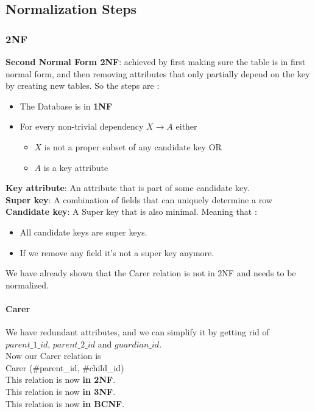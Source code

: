 \documentclass{article}
\begin{document}
\subsection{Normalization Steps}
\subsubsection{2NF}
\begin{tcolorbox}
    \textbf{Second Normal Form 2NF}: achieved by first making sure the table is in first normal form, and then removing attributes that only partially depend on the key by creating new tables. So the steps are :
    \begin{itemize}
        \item The Database is in \textbf{1NF}
        \item For every non-trivial dependency $X\rightarrow A$ either
        \begin{itemize}
            \item $X$ is not a proper subset of any candidate key OR
            \item $A$ is a key attribute
        \end{itemize}
    \end{itemize}
     \textbf{Key attribute}: An attribute that is part of some candidate key.\\
     \textbf{Super key}: A combination of fields that can uniquely determine a row \\
    \textbf{Candidate key}: A Super key that is also minimal. Meaning that :
     \begin{itemize}
         \item All candidate keys are super keys. 
         \item If we remove any field it's not a super key anymore.
     \end{itemize}
\end{tcolorbox}
We have already shown that the Carer relation is not in 2NF and needs to be normalized.

\paragraph{Carer}
We have redundant attributes, and we can simplify it by getting rid of \\
$parent\_1\_id$, $parent\_2\_id$ and $guardian\_id$.\\
Now our Carer relation is \\
Carer (\#parent\_id, \#child\_id)\\
This relation is now \textbf{in 2NF}.\\
This relation is now \textbf{in 3NF}.\\
This relation is now \textbf{in BCNF}.
\end{document}
